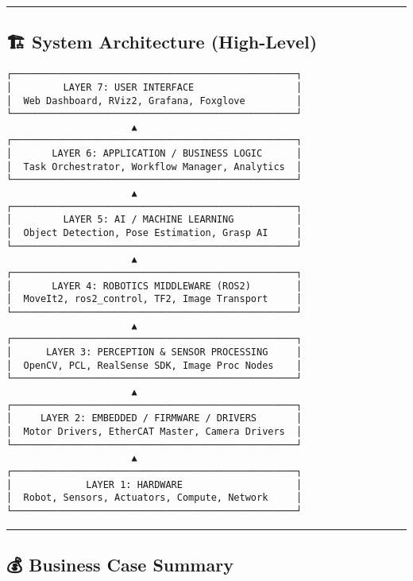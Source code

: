 \documentclass[
]{article}
\begin{document}
\begin{center}\rule{0.5\linewidth}{0.5pt}\end{center}

\hypertarget{system-architecture-high-level}{%
\subsection{🏗️ System Architecture
(High-Level)}\label{system-architecture-high-level}}

\begin{verbatim}
┌──────────────────────────────────────────────────┐
│         LAYER 7: USER INTERFACE                  │
│  Web Dashboard, RViz2, Grafana, Foxglove         │
└──────────────────────────────────────────────────┘
                      ▲
┌──────────────────────────────────────────────────┐
│       LAYER 6: APPLICATION / BUSINESS LOGIC      │
│  Task Orchestrator, Workflow Manager, Analytics  │
└──────────────────────────────────────────────────┘
                      ▲
┌──────────────────────────────────────────────────┐
│         LAYER 5: AI / MACHINE LEARNING           │
│  Object Detection, Pose Estimation, Grasp AI     │
└──────────────────────────────────────────────────┘
                      ▲
┌──────────────────────────────────────────────────┐
│       LAYER 4: ROBOTICS MIDDLEWARE (ROS2)        │
│  MoveIt2, ros2_control, TF2, Image Transport     │
└──────────────────────────────────────────────────┘
                      ▲
┌──────────────────────────────────────────────────┐
│      LAYER 3: PERCEPTION & SENSOR PROCESSING     │
│  OpenCV, PCL, RealSense SDK, Image Proc Nodes    │
└──────────────────────────────────────────────────┘
                      ▲
┌──────────────────────────────────────────────────┐
│     LAYER 2: EMBEDDED / FIRMWARE / DRIVERS       │
│  Motor Drivers, EtherCAT Master, Camera Drivers  │
└──────────────────────────────────────────────────┘
                      ▲
┌──────────────────────────────────────────────────┐
│             LAYER 1: HARDWARE                    │
│  Robot, Sensors, Actuators, Compute, Network     │
└──────────────────────────────────────────────────┘
\end{verbatim}

\begin{center}\rule{0.5\linewidth}{0.5pt}\end{center}

\hypertarget{business-case-summary}{%
\subsection{💰 Business Case Summary}\label{business-case-summary}}
\end{document}
